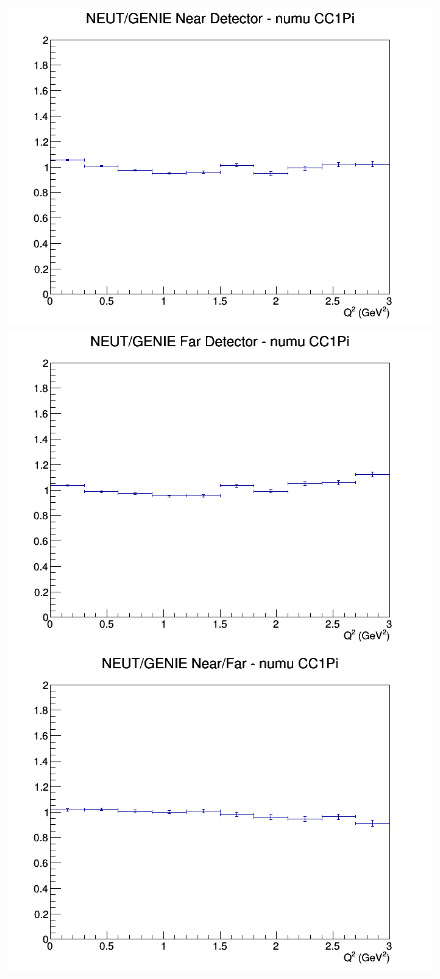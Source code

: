 \documentclass[12pt]{article}
\begin{document}
\begin{figure}[h]
\endminipage
\newline
{}
\includegraphics[width=\linewidth]{Q2/nominal/ratios/CC1Pi_NEUT_GENIE_numu_near_Q2.png}
\endminipage
{}
\includegraphics[width=\linewidth]{Q2/nominal/ratios/CC1Pi_NEUT_GENIE_numu_far_Q2.png}
\endminipage
{}
\includegraphics[width=\linewidth]{Q2/nominal/ratios/CC1Pi_NEUT_GENIE_numu_NF_Q2.png}

\end{figure}
\end{document}
